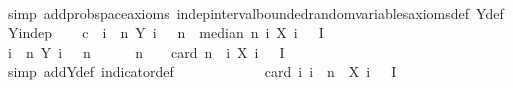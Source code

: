 \begin{isabellebody}
\ \ \ \ \isamarkupfalse%
\ {\isacharparenleft}{\kern0pt}simp\ add{\isacharcolon}{\kern0pt}prob{\isacharunderscore}{\kern0pt}space{\isacharunderscore}{\kern0pt}axioms\ indep{\isacharunderscore}{\kern0pt}interval{\isacharunderscore}{\kern0pt}bounded{\isacharunderscore}{\kern0pt}random{\isacharunderscore}{\kern0pt}variables{\isacharunderscore}{\kern0pt}axioms{\isacharunderscore}{\kern0pt}def\ Y{\isacharunderscore}{\kern0pt}def\ Y{\isacharunderscore}{\kern0pt}indep{\isacharparenright}{\kern0pt}\isanewline
\isanewline
\ \ \isamarkupfalse%
\ c{\isacharcolon}{\kern0pt}\ {\isachardoublequoteopen}{\isasymAnd}{\isasymomega}{\isachardot}{\kern0pt}\ {\isacharparenleft}{\kern0pt}{\isasymSum}i\ {\isacharequal}{\kern0pt}\ {}{\isachardot}{\kern0pt}{\isachardot}{\kern0pt}{\isacharless}{\kern0pt}n{\isachardot}{\kern0pt}\ Y\ i\ {\isasymomega}{\isacharparenright}{\kern0pt}\ {\isachargreater}{\kern0pt}\ n{\isacharslash}{\kern0pt}{}\ {\isasymLongrightarrow}\ median\ n\ {\isacharparenleft}{\kern0pt}{\isasymlambda}i{\isachardot}{\kern0pt}\ X\ i\ {\isasymomega}{\isacharparenright}{\kern0pt}\ {\isasymin}\ I{\isachardoublequoteclose}\isanewline
\ \ \isamarkupfalse%
\ {\isacharminus}{\kern0pt}\isanewline
\ \ \ \ \isamarkupfalse%
\ {\isasymomega}\isanewline
\ \ \ \ \isamarkupfalse%
\ {\isachardoublequoteopen}{\isacharparenleft}{\kern0pt}{\isasymSum}i\ {\isacharequal}{\kern0pt}\ {}{\isachardot}{\kern0pt}{\isachardot}{\kern0pt}{\isacharless}{\kern0pt}n{\isachardot}{\kern0pt}\ Y\ i\ {\isasymomega}{\isacharparenright}{\kern0pt}\ {\isachargreater}{\kern0pt}\ n{\isacharslash}{\kern0pt}{}{\isachardoublequoteclose}\isanewline
\ \ \ \ \isamarkupfalse%
\ {\isachardoublequoteopen}n\ {\isacharless}{\kern0pt}\ {}\ {\isacharasterisk}{\kern0pt}\ card\ {\isacharparenleft}{\kern0pt}{\isacharbraceleft}{\kern0pt}{}{\isachardot}{\kern0pt}{\isachardot}{\kern0pt}{\isacharless}{\kern0pt}n{\isacharbraceright}{\kern0pt}\ {\isasyminter}\ {\isacharbraceleft}{\kern0pt}i{\isachardot}{\kern0pt}\ X\ i\ {\isasymomega}\ {\isasymin}\ I{\isacharbraceright}{\kern0pt}{\isacharparenright}{\kern0pt}{\isachardoublequoteclose}\ \isanewline
\ \ \ \ \ \ \isamarkupfalse%
\ {\isacharparenleft}{\kern0pt}simp\ add{\isacharcolon}{\kern0pt}Y{\isacharunderscore}{\kern0pt}def\ indicator{\isacharunderscore}{\kern0pt}def{\isacharparenright}{\kern0pt}\ \isanewline
\ \ \ \ \isamarkupfalse%
\ \isamarkupfalse%
\ {\isachardoublequoteopen}{\isachardot}{\kern0pt}{\isachardot}{\kern0pt}{\isachardot}{\kern0pt}\ {\isacharequal}{\kern0pt}\ {}\ {\isacharasterisk}{\kern0pt}\ card\ {\isacharbraceleft}{\kern0pt}i{\isachardot}{\kern0pt}\ i\ {\isacharless}{\kern0pt}\ n\ {\isasymand}\ X\ i\ {\isasymomega}\ {\isasymin}\ I{\isacharbraceright}{\kern0pt}{\isachardoublequoteclose}\isanewline

\end{isabellebody}
